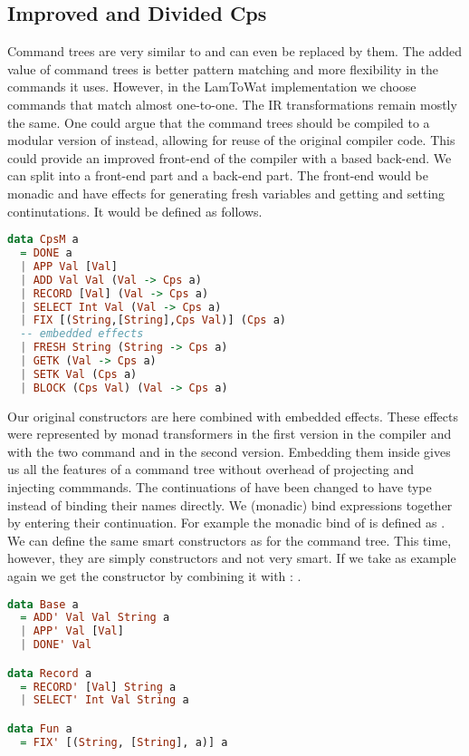 \subsection{Improved and Divided Cps}
Command trees are very similar to  and can even be replaced by them. The added value of command trees is better pattern matching and more flexibility in the commands it uses. However, in the LamToWat implementation we choose commands that match  almost one-to-one. The IR transformations remain mostly the same. One could argue that the command trees should be compiled to a modular version of  instead, allowing for reuse of the original compiler code. This could provide an improved front-end of the compiler with a  based back-end. We can split  into a front-end part and a back-end part. The front-end would be monadic and have effects for generating fresh variables and getting and setting continutations. It would be defined as follows.

\begin{lstlisting}[language=Haskell]
data CpsM a
  = DONE a
  | APP Val [Val]
  | ADD Val Val (Val -> Cps a)
  | RECORD [Val] (Val -> Cps a)
  | SELECT Int Val (Val -> Cps a)
  | FIX [(String,[String],Cps Val)] (Cps a)
  -- embedded effects
  | FRESH String (String -> Cps a)
  | GETK (Val -> Cps a)
  | SETK Val (Cps a)
  | BLOCK (Cps Val) (Val -> Cps a)
\end{lstlisting}

Our original constructors are here combined with embedded effects. These effects were represented by monad transformers in the first version in the compiler and with the two command  and  in the second version. Embedding them inside gives us all the features of a command tree without overhead of projecting and injecting commmands. The continuations of  have been changed to have type  instead of binding their names directly. We (monadic) bind expressions together by entering their continuation. For example the monadic bind of  is defined as . We can define the same smart constructors as for the command tree. This time, however, they are simply constructors and not very smart. If we take  as example again we get the constructor by combining it with : .

\begin{lstlisting}[language=Haskell]
data Base a
  = ADD' Val Val String a
  | APP' Val [Val]
  | DONE' Val

data Record a
  = RECORD' [Val] String a
  | SELECT' Int Val String a

data Fun a
  = FIX' [(String, [String], a)] a
\end{lstlisting}

